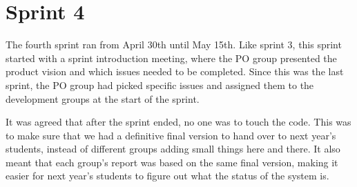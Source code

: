 \chapter{Sprint 4}
The fourth sprint ran from April 30th until May 15th. Like sprint 3, this sprint started with a sprint introduction meeting, where the PO group presented the product vision and which issues needed to be completed. Since this was the last sprint, the PO group had picked specific issues and assigned them to the development groups at the start of the sprint.  

It was agreed that after the sprint ended, no one was to touch the code. This was to make sure that we had a definitive final version to hand over to next year's students, instead of different groups adding small things here and there. It also meant that each group's report was based on the same final version, making it easier for next year's students to figure out what the status of the system is. 